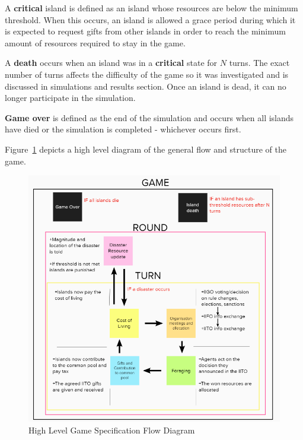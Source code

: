 \begin{definition} \label{def:critical}
    A \textbf{critical} island is defined as an island whose resources are below the minimum threshold. When this occurs, an island is allowed a grace period during which it is expected to request gifts from other islands in order to reach the minimum amount of resources required to stay in the game.
\end{definition}

\begin{definition} \label{def:death}
    A \textbf{death} occurs when an island was in a \textbf{critical} state for $N$ turns. The exact number of turns affects the difficulty of the game so it was investigated and is discussed in simulations and results section. Once an island is dead, it can no longer participate in the simulation.
\end{definition}

\begin{definition} \label{def:gameover}
    \textbf{Game over} is defined as the end of the simulation and occurs when all islands have died or the simulation is completed - whichever occurs first.
\end{definition}

Figure~\ref{fig:gamedesign-flow} depicts a high level diagram of the general flow and structure of the game.

\begin{figure}[!htb]
    \centering
    \includegraphics{03_gamedesign/images/gamespec-flow.png}
    \caption{High Level Game Specification Flow Diagram}
    \label{fig:gamedesign-flow}
\end{figure}

